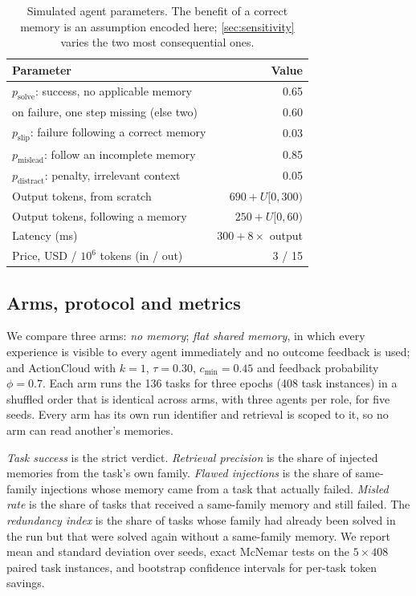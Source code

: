 \documentclass[5p,times,twocolumn]{elsarticle}
\newcommand{\sysname}{ActionCloud}
\begin{document}
\begin{table}[t]
\centering
\caption{Simulated agent parameters. The benefit of a correct memory is an assumption encoded here; \cref{sec:sensitivity} varies the two most consequential ones.}
\label{tab:sim}
\small
\setlength{\tabcolsep}{4pt}
\begin{tabular}{@{}lr@{}}
\toprule
Parameter & Value \\
\midrule
$p_{\mathrm{solve}}$: success, no applicable memory & 0.65 \\
\quad on failure, one step missing (else two) & 0.60 \\
$p_{\mathrm{slip}}$: failure following a correct memory & 0.03 \\
$p_{\mathrm{mislead}}$: follow an incomplete memory & 0.85 \\
$p_{\mathrm{distract}}$: penalty, irrelevant context & 0.05 \\
Output tokens, from scratch & $690 + U[0,300)$ \\
Output tokens, following a memory & $250 + U[0,60)$ \\
Latency (ms) & $300 + 8 \times$ output \\
Price, USD / $10^6$ tokens (in / out) & 3 / 15 \\
\bottomrule
\end{tabular}
\end{table}

\subsection{Arms, protocol and metrics}
We compare three arms: \emph{no memory}; \emph{flat shared memory}, in which every experience is visible to every agent immediately and no outcome feedback is used; and \sysname{} with $k=1$, $\tau=0.30$, $c_{\min}=0.45$ and feedback probability $\phi=0.7$. Each arm runs the 136 tasks for three epochs (408 task instances) in a shuffled order that is identical across arms, with three agents per role, for five seeds. Every arm has its own run identifier and retrieval is scoped to it, so no arm can read another's memories.

\emph{Task success} is the strict verdict. \emph{Retrieval precision} is the share of injected memories from the task's own family. \emph{Flawed injections} is the share of same-family injections whose memory came from a task that actually failed. \emph{Misled rate} is the share of tasks that received a same-family memory and still failed. The \emph{redundancy index} is the share of tasks whose family had already been solved in the run but that were solved again without a same-family memory. We report mean and standard deviation over seeds, exact McNemar tests on the $5\times408$ paired task instances, and bootstrap confidence intervals for per-task token savings.
\end{document}
